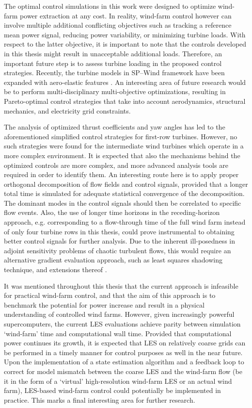 The optimal control simulations in this work were designed to optimize wind-farm power extraction at any cost. In reality, wind-farm control however can involve multiple additional conflicting objectives such as tracking a reference mean power signal, reducing power variability, or minimizing turbine loads. With respect to the latter objective, it is important to note that the controls developed in this thesis might result in unacceptable additional loads. Therefore, an important future step is to assess turbine loading in the proposed control strategies. Recently, the turbine models in SP--Wind framework have been expanded with aero-elastic features \citep{vitsas2016multiscale}. An interesting area of future research would be to perform multi-disciplinary multi-objective optimizations, resulting in Pareto-optimal control strategies that take into account aerodynamics, structural mechanics, and electricity grid constraints.

The analysis of optimized thrust coefficients and yaw angles has led to the aforementioned simplified control strategies for first-row turbines. However, no such strategies were found for the intermediate wind turbines which operate in a more complex environment. It is expected that also the mechanisms behind the optimized controls are more complex, and more advanced analysis tools are required in order to identify them. An interesting route here is to apply proper orthogonal decomposition of flow fields and control signals, provided that a longer total time is simulated for adequate statistical convergence of the decomposition. The dominant modes in the control signals should then be correlated to specific flow events. Also, the use of longer time horizons in the receding-horizon approach, e.g. corresponding to a flow-through time of the full wind farm instead of only four turbine rows in this thesis, could prove instrumental to obtaining better control signals for further analysis. Due to the inherent ill-posedness in adjoint sensitivity problems of chaotic turbulent flows, this would require an alternative gradient evaluation approach, such as least squares shadowing technique, and extensions thereof \citep{wang2014least, chater2016simplified, blonigan2017multigrid}.

It was mentioned throughout this thesis that the current approach is infeasible for practical wind-farm control, and that the aim of this approach is to benchmark the potential for power increase and result in a physical understanding of controlled wind farms. However, given increasingly powerful supercomputers, the current LES evaluations achieve parity between simulation `wind-farm' time and computational wall time. Provided that computational power continues its growth, it is expected that LES on relatively coarse grids can be performed in a timely manner for control purposes as well in the near future. Upon the implementation of a state estimation algorithm and a feedback loop to correct for model mismatch between the coarse LES and the wind-farm flow (be it in the form of a `virtual' high-resolution wind-farm LES or an actual wind farm), LES-based wind-farm control could potentially be implemented in practice. This marks a final interesting area for further research.


\cleardoublepage

